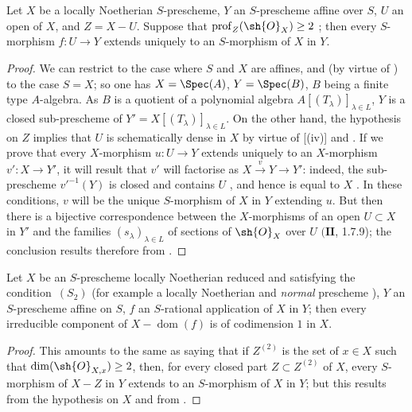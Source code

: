 \begin{proposition}[20.4.11]
\label{IV.20.4.11}
Let $X$ be a locally Noetherian $S$-prescheme, $Y$ an $S$-prescheme affine over $S$, $U$ an open of $X$, and $Z=X-U$.
Suppose that $\operatorname{prof}_Z(\sh{O}_X)\geq 2$ ;
then every $S$-morphism $f:U\to Y$ extends uniquely to an $S$-morphism of $X$ in $Y$.
\end{proposition}

\begin{proof}
We can restrict to the case where $S$ and $X$ are affines, and (by virtue of ) to the case $S=X$;
so one has $X=\Spec(A)$, $Y=\Spec(B)$, $B$ being a finite type $A$-algebra.
As $B$ is a quotient of a polynomial algebra $A[(T_\lambda)]_{\lambda\in L}$, $Y$ is a closed sub-prescheme of $Y'=X[(T_\lambda)]_{\lambda\in L}$.
On the other hand, the hypothesis on $Z$ implies that $U$ is schematically dense in $X$ by virtue of [(iv)] and .
If we prove that every $X$-morphism $u:U\to Y$ extends uniquely to an $X$-morphism $v':X\to Y'$, it will result that $v'$ will factorise as $X\xrightarrow{v}Y\to Y'$:
indeed, the sub-prescheme $v'^{-1}(Y)$ is closed and contains $U$ , and hence is equal to $X$ .
In these conditions, $v$ will be the unique $S$-morphism of $X$ in $Y$ extending $u$.
But then there is a bijective correspondence between the $X$-morphisms of an open $U\subset X$ in $Y'$ and the families $(s_\lambda)_{\lambda\in L}$ of sections of $\sh{O}_X$ over $U$ $(\mathbf{II}$, 1.7.9);
the conclusion results therefore from .
\end{proof}

\begin{corollary}[20.4.12]
\label{IV.20.4.12}
Let $X$ be an $S$-prescheme locally Noetherian reduced and satisfying the condition~$(S_2)$  (for example a locally Noetherian and \emph{normal} prescheme ), $Y$ an $S$-prescheme affine on $S$, $f$ an $S$-rational application of $X$ in $Y$;
then every irreducible component of $X-\operatorname{dom}(f)$ is of codimension $1$ in $X$.
\end{corollary}

\begin{proof}
This amounts to the same as saying that if $Z^{(2)}$ is the set of $x\in X$ such that $\dim(\sh{O}_{X,x})\geq 2$, then, for every closed part $Z\subset Z^{(2)}$ of $X$, every $S$-morphism of $X-Z$ in $Y$ extends to an $S$-morphism of $X$ in $Y$;
but this results from the hypothesis on $X$  and from .
\end{proof}

